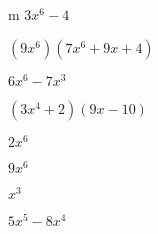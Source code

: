 \documentclass{article}
\begin{document}
\begin{multicols}{2}
m $3x^{6}-4$\item $(9x^{6})(7x^{6}+9x+4)$\item $6x^{6}-7x^{3}$\item $(3x^{4}+2)(9x-10)$\item $2x^{6}$\item $9x^{6}$\item $x^{3}$\item $5x^{5}-8x^{4}$\item 
\end{multicols}
\end{document}
